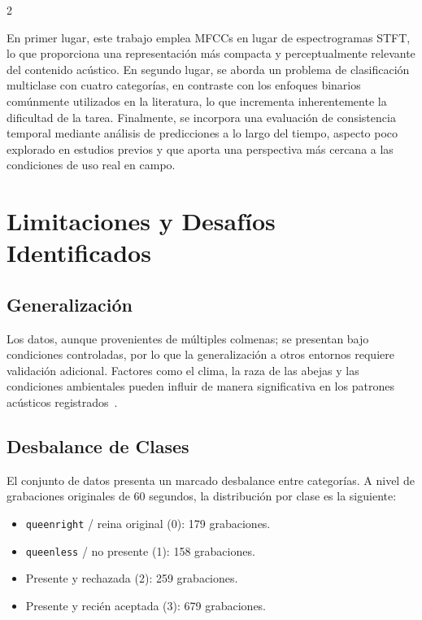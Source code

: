 \documentclass[12pt]{report}
\newenvironment{tightmulticols}{%
  \begin{multicols}{2}
  \setlength{\parskip}{1.2pt}
  \linespread{1}\selectfont
}{%
  \end{multicols}
}
\begin{document}
\begin{tightmulticols}
\par En primer lugar, este trabajo emplea MFCCs en lugar de espectrogramas STFT, lo que proporciona una representación más compacta y perceptualmente relevante del contenido acústico. En segundo lugar, se aborda un problema de clasificación multiclase con cuatro categorías, en contraste con los enfoques binarios comúnmente utilizados en la literatura, lo que incrementa inherentemente la dificultad de la tarea. Finalmente, se incorpora una evaluación de consistencia temporal mediante análisis de predicciones a lo largo del tiempo, aspecto poco explorado en estudios previos y que aporta una perspectiva más cercana a las condiciones de uso real en campo.

\section{Limitaciones y Desafíos Identificados}

\subsection{Generalización}

\noindent Los datos, aunque provenientes de múltiples colmenas; se presentan bajo condiciones controladas, por lo que la generalización a otros entornos requiere validación adicional. Factores como el clima, la raza de las abejas y las condiciones ambientales pueden influir de manera significativa en los patrones acústicos registrados~\cite{potts2016}.

\subsection{Desbalance de Clases}

\noindent El conjunto de datos presenta un marcado desbalance entre categorías. A nivel de grabaciones originales de 60 segundos, la distribución por clase es la siguiente:

\begin{itemize}
    \item \texttt{queenright} / reina original (0): 179 grabaciones.
    \item \texttt{queenless} / no presente (1): 158 grabaciones.
    \item Presente y rechazada (2): 259 grabaciones.
    \item Presente y recién aceptada (3): 679 grabaciones.
\end{itemize}


\end{tightmulticols}
\end{document}
